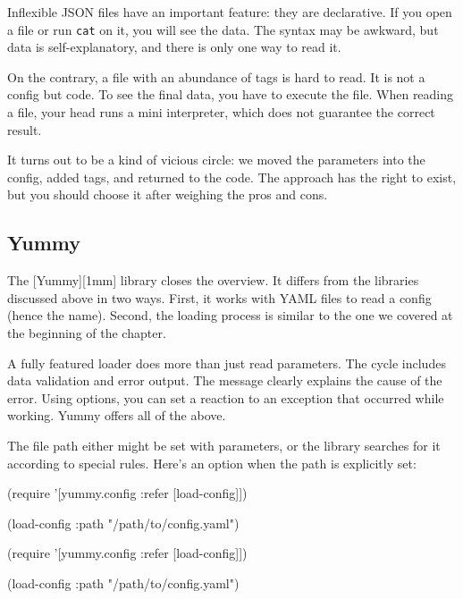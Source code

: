 Inflexible JSON files have an important feature: they are declarative. If you open a file or run \verb|cat| on it, you will see the data. The syntax may be awkward, but data is self-explanatory, and there is only one way to read it.

On the contrary, a file with an abundance of tags is hard to read. It is not a config but code. To see the final data, you have to execute the file. When reading a file, your head runs a mini interpreter, which does not guarantee the correct result.

It turns out to be a kind of vicious circle: we moved the parameters into the config, added tags, and returned to the code. The approach has the right to exist, but you should choose it after weighing the pros and cons.

\subsection{Yummy}


The [Yummy][1mm] library closes the overview. It differs from the libraries discussed above in two ways. First, it works with YAML files to read a config (hence the name). Second, the loading process is similar to the one we covered at the beginning of the chapter.

A fully featured loader does more than just read parameters. The cycle includes data validation and error output. The message clearly explains the cause of the error. Using options, you can set a reaction to an exception that occurred while working. Yummy offers all of the above.

The file path either might be set with parameters, or the library searches for it according to special rules. Here's an option when the path is explicitly set:

\ifnarrow

\begin{clojure}
(require
  '[yummy.config :refer [load-config]])

(load-config
  {:path "/path/to/config.yaml"})
\end{clojure}

\else

\begin{clojure}
(require '[yummy.config :refer [load-config]])

(load-config {:path "/path/to/config.yaml"})
\end{clojure}


